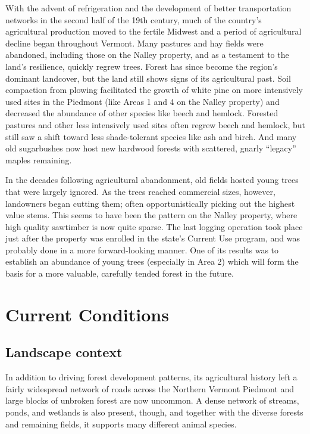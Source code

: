 \documentclass[]{tufte-handout}
\begin{document}
With the advent of refrigeration and the development of better
transportation networks in the second half of the 19th century, much of
the country's agricultural production moved to the fertile Midwest and a
period of agricultural decline began throughout Vermont. Many pastures
and hay fields were abandoned, including those on the Nalley property,
and as a testament to the land's resilience, quickly regrew trees.
Forest has since become the region's dominant landcover, but the land
still shows signs of its agricultural past. Soil compaction from plowing
facilitated the growth of white pine on more intensively used sites in
the Piedmont (like Areas 1 and 4 on the Nalley property) and decreased
the abundance of other species like beech and hemlock. Forested pastures
and other less intensively used sites often regrew beech and hemlock,
but still saw a shift toward less shade-tolerant species like ash and
birch. And many old sugarbushes now host new hardwood forests with
scattered, gnarly ``legacy'' maples remaining.

In the decades following agricultural abandonment, old fields hosted
young trees that were largely ignored. As the trees reached commercial
sizes, however, landowners began cutting them; often opportunistically
picking out the highest value stems. This seems to have been the pattern
on the Nalley property, where high quality sawtimber is now quite
sparse. The last logging operation took place just after the property
was enrolled in the state's Current Use program, and was probably done
in a more forward-looking manner. One of its results was to establish an
abundance of young trees (especially in Area 2) which will form the
basis for a more valuable, carefully tended forest in the future.

\section{Current Conditions}\label{current-conditions}

\subsection{Landscape context}\label{landscape-context}

In addition to driving forest development patterns, its agricultural
history left a fairly widespread network of roads across the Northern
Vermont Piedmont and large blocks of unbroken forest are now uncommon. A
dense network of streams, ponds, and wetlands is also present, though,
and together with the diverse forests and remaining fields, it supports
many different animal species.
\end{document}

